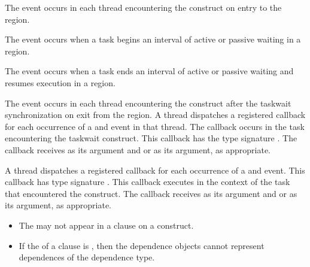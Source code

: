 \events
The  event occurs in each thread encountering the
 construct on entry to the  region.

The  event occurs when a task begins an interval of active or passive waiting
in a  region.

The  event occurs when a task ends an interval of active or passive waiting
and resumes execution in a  region.

The  event occurs in each thread encountering the
 construct after the taskwait synchronization on exit from the
 region.
\tools
A thread dispatches a registered 
callback for each occurrence of a  and  event
in that thread.  The callback occurs in the task encountering
the taskwait construct.  This callback has the type signature
.
The callback receives
 as its  argument and
 or 
as its  argument, as appropriate.

A thread dispatches a registered
 callback
for each occurrence of a  and  event.
This callback has type signature .
This callback executes in the context of the task that encountered the
 construct. The callback receives
 as its  argument and
 or 
as its  argument, as appropriate.

\restrictions

\begin{itemize}
 \item The   may not appear in a
 clause on a  construct.
 \item If the  of a  clause is , then the dependence
 objects cannot represent dependences of the 
  dependence type.
\end{itemize}

